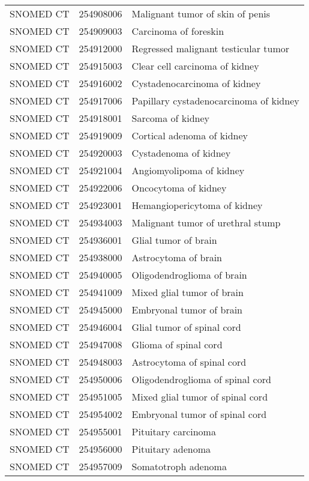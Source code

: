 \begin{longtable}{p{}p{}p{}}
  SNOMED CT & 254908006 & Malignant tumor of skin of penis \\ 
  SNOMED CT & 254909003 & Carcinoma of foreskin \\ 
  SNOMED CT & 254912000 & Regressed malignant testicular tumor \\ 
  SNOMED CT & 254915003 & Clear cell carcinoma of kidney \\ 
  SNOMED CT & 254916002 & Cystadenocarcinoma of kidney \\ 
  SNOMED CT & 254917006 & Papillary cystadenocarcinoma of kidney \\ 
  SNOMED CT & 254918001 & Sarcoma of kidney \\ 
  SNOMED CT & 254919009 & Cortical adenoma of kidney \\ 
  SNOMED CT & 254920003 & Cystadenoma of kidney \\ 
  SNOMED CT & 254921004 & Angiomyolipoma of kidney \\ 
  SNOMED CT & 254922006 & Oncocytoma of kidney \\ 
  SNOMED CT & 254923001 & Hemangiopericytoma of kidney \\ 
  SNOMED CT & 254934003 & Malignant tumor of urethral stump \\ 
  SNOMED CT & 254936001 & Glial tumor of brain \\ 
  SNOMED CT & 254938000 & Astrocytoma of brain \\ 
  SNOMED CT & 254940005 & Oligodendroglioma of brain \\ 
  SNOMED CT & 254941009 & Mixed glial tumor of brain \\ 
  SNOMED CT & 254945000 & Embryonal tumor of brain \\ 
  SNOMED CT & 254946004 & Glial tumor of spinal cord \\ 
  SNOMED CT & 254947008 & Glioma of spinal cord \\ 
  SNOMED CT & 254948003 & Astrocytoma of spinal cord \\ 
  SNOMED CT & 254950006 & Oligodendroglioma of spinal cord \\ 
  SNOMED CT & 254951005 & Mixed glial tumor of spinal cord \\ 
  SNOMED CT & 254954002 & Embryonal tumor of spinal cord \\ 
  SNOMED CT & 254955001 & Pituitary carcinoma \\ 
  SNOMED CT & 254956000 & Pituitary adenoma \\ 
  SNOMED CT & 254957009 & Somatotroph adenoma \\ 

\end{longtable}
